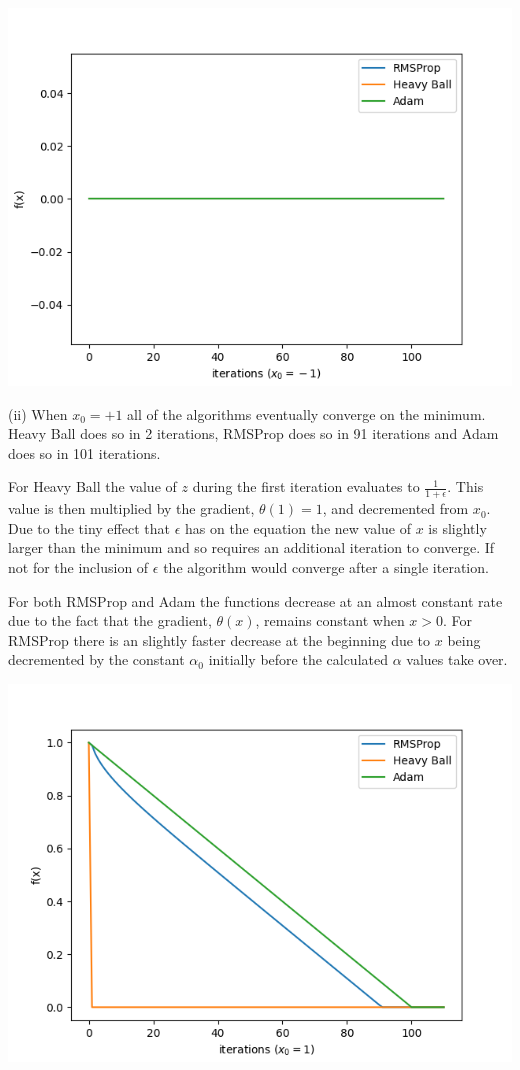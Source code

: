 \documentclass[12pt]{article}
\begin{document}
\begin{center}
    \includegraphics[scale=0.6]{figs/c/c_i.png}
\end{center}

\noindent (ii) When $x_0=+1$ all of the algorithms eventually converge on the minimum. Heavy Ball does so in 2 iterations, RMSProp does so in 91 iterations and Adam does so in 101 iterations.

For Heavy Ball the value of $z$ during the first iteration evaluates to $\frac{1}{1+\epsilon}$. This value is then multiplied by the gradient, $\theta(1)=1$, and decremented from $x_0$. Due to the tiny effect that $\epsilon$ has on the equation the new value of $x$ is slightly larger than the minimum and so requires an additional iteration to converge. If not for the inclusion of $\epsilon$ the algorithm would converge after a single iteration.

For both RMSProp and Adam the functions decrease at an almost constant rate due to the fact that the gradient, $\theta(x)$, remains constant when $x > 0$. For RMSProp there is an slightly faster decrease at the beginning due to $x$ being decremented by the constant $\alpha_0$ initially before the calculated $\alpha$ values take over.

\begin{center}
    \includegraphics[scale=0.6]{figs/c/c_ii.png}
\end{center}
\end{document}
